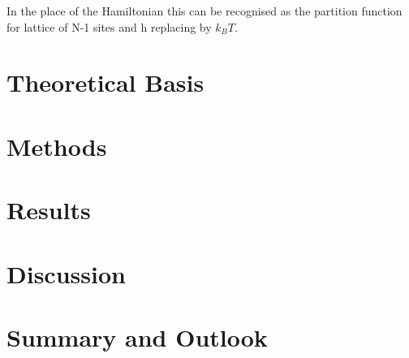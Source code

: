 \documentclass{article}
\begin{document}
\noindent
In the place of the Hamiltonian this can be recognised as the partition function for lattice of N-1 sites and h replacing by $k_BT$.


	\section{Theoretical Basis}
	\section{Methods}
	\section{Results}
	\section{Discussion}
	\section{Summary and Outlook}
\end{document}

